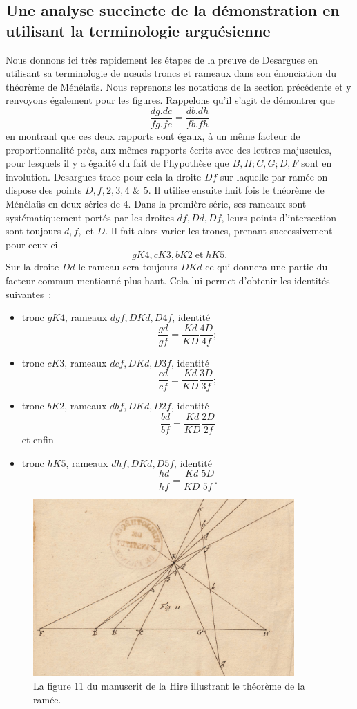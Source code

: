 \documentclass[12pt, a4paper]{article}
\begin{document}
\subsection{Une analyse succincte de la démonstration en utilisant la terminologie arguésienne}
Nous donnons ici très rapidement les étapes de la preuve de Desargues en utilisant sa terminologie de n{\oe}uds troncs et rameaux dans son énonciation du théorème de Ménélaüs. Nous reprenons les notations de la section précédente et y renvoyons également pour les figures. Rappelons qu'il s'agit de démontrer que
\[
\frac{dg.dc}{fg.fc}=\frac{db.dh}{fb.fh}
\]
en montrant que ces deux rapports sont égaux, à un même facteur de proportionnalité près, aux mêmes rapports écrits avec des lettres majuscules, pour lesquels il y a égalité du fait de l'hypothèse que $B,H;C,G;D,F$ sont en involution. Desargues trace pour cela la droite $Df$ sur laquelle par ramée on dispose des points $D,f,2,3,4$ \& $5$. Il utilise ensuite huit fois le théorème de Ménélaüs en deux séries de 4. Dans la première série, ses rameaux sont systématiquement portés par les  droites $df, Dd, Df$, leurs points d'intersection sont toujours $d,f,$ et $D$. Il fait alors varier les troncs, prenant successivement pour ceux-ci 
\[
gK4,cK3,bK2\;\mbox{et}\;hK5.
\]
Sur la droite $Dd$ le rameau sera toujours $DKd$ ce qui donnera une partie du facteur commun mentionné plus haut. Cela lui permet d'obtenir les identités suivantes~:~
\begin{itemize}
\item tronc $gK4$, rameaux $dgf, DKd, D4f$, identité
\[
\frac{gd}{gf}=\frac{Kd}{KD}\frac{4D}{4f};
\]
\item tronc $cK3$, rameaux $dcf, DKd, D3f$, identité
\[
\frac{cd}{cf}=\frac{Kd}{KD}\frac{3D}{3f};
\]
\item tronc $bK2$, rameaux $dbf, DKd, D2f$, identité
\[
\frac{bd}{bf}=\frac{Kd}{KD}\frac{2D}{2f}
\]
et enfin
\item tronc $hK5$, rameaux $dhf, DKd, D5f$, identité
\[
\frac{hd}{hf}=\frac{Kd}{KD}\frac{5D}{5f}.
\]
\end{itemize}

\begin{figure}[!ht]%
\centering
\includegraphics[width=10cm]{LaHire-Figure-11.jpg}
\caption{La figure 11 du manuscrit de la Hire illustrant le théorème de la ramée.}
\label{LaHire-Figure-11}
\end{figure}
\end{document}
